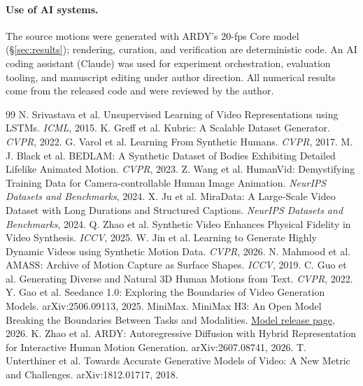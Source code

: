 \documentclass[10pt,twocolumn]{article}
\begin{document}
\paragraph{Use of AI systems.} The source motions were generated with ARDY's 20-fps Core model
(\S\ref{sec:results}); rendering, curation, and verification are deterministic code. An AI coding assistant
(Claude) was used for experiment orchestration, evaluation tooling, and manuscript editing under author
direction. All numerical results come from the released code and were reviewed by the author.

\balance
\begin{thebibliography}{99}\footnotesize
\setlength{\itemsep}{0pt}
\setlength{\parskip}{0pt}
 N. Srivastava et al. Unsupervised Learning of Video Representations using LSTMs. \emph{ICML}, 2015.
 K. Greff et al. Kubric: A Scalable Dataset Generator. \emph{CVPR}, 2022.
 G. Varol et al. Learning From Synthetic Humans. \emph{CVPR}, 2017.
 M. J. Black et al. BEDLAM: A Synthetic Dataset of Bodies Exhibiting Detailed Lifelike Animated Motion. \emph{CVPR}, 2023.
 Z. Wang et al. HumanVid: Demystifying Training Data for Camera-controllable Human Image Animation. \emph{NeurIPS Datasets and Benchmarks}, 2024.
 X. Ju et al. MiraData: A Large-Scale Video Dataset with Long Durations and Structured Captions. \emph{NeurIPS Datasets and Benchmarks}, 2024.
 Q. Zhao et al. Synthetic Video Enhances Physical Fidelity in Video Synthesis. \emph{ICCV}, 2025.
 W. Jin et al. Learning to Generate Highly Dynamic Videos using Synthetic Motion Data. \emph{CVPR}, 2026.
 N. Mahmood et al. AMASS: Archive of Motion Capture as Surface Shapes. \emph{ICCV}, 2019.
 C. Guo et al. Generating Diverse and Natural 3D Human Motions from Text. \emph{CVPR}, 2022.
 Y. Gao et al. Seedance 1.0: Exploring the Boundaries of Video Generation Models. arXiv:2506.09113, 2025.
 MiniMax. MiniMax H3: An Open Model Breaking the Boundaries Between Tasks and Modalities.
\href{https://www.minimax.io/blog/minimax-h3}{Model release page}, 2026.
 K. Zhao et al. ARDY: Autoregressive Diffusion with Hybrid Representation for Interactive Human Motion Generation. arXiv:2607.08741, 2026.
 T. Unterthiner et al. Towards Accurate Generative Models of Video: A New Metric and Challenges. arXiv:1812.01717, 2018.

\end{thebibliography}
\end{document}
